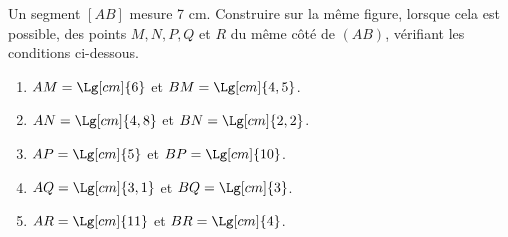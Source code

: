 \begin{exercice}
    Un segment $[AB]$ mesure 7 cm. Construire sur la même figure, lorsque cela est possible, des points $M, N, P, Q$ et $R$ du même côté de $(AB)$, vérifiant les conditions ci-dessous.
    \begin{enumerate}
       \item $AM = \Lg[cm]{6  }$ et $BM = \Lg[cm]{4,5}$.
       \item $AN = \Lg[cm]{4,8}$ et $BN = \Lg[cm]{2,2}$.
       \item $AP = \Lg[cm]{5  }$ et $BP = \Lg[cm]{10 }$.
       \item $AQ = \Lg[cm]{3,1}$ et $BQ = \Lg[cm]{3  }$.
       \item $AR = \Lg[cm]{11 }$ et $BR = \Lg[cm]{4  }$.
    \end{enumerate}
\end{exercice}